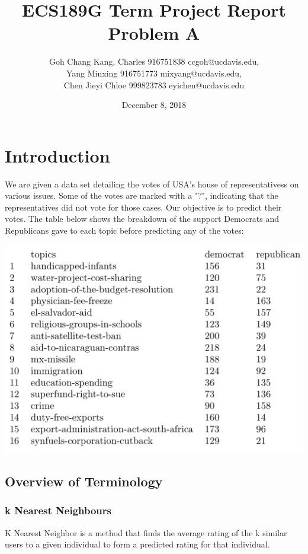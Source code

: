 \documentclass{article}
\begin{document}
\begin{titlepage}
\title{ECS189G Term Project Report Problem A}
\author{Goh Chang Kang, Charles 916751838 ccgoh@ucdavis.edu, \\
Yang Minxing 916751773 mixyang@ucdavis.edu, \\ 
Chen Jieyi Chloe 999823783 eyichen@ucdavis.edu}

\date{December 8, 2018}
\maketitle
\end{titlepage}

\tableofcontents
\pagebreak

\section{Introduction}

We are given a data set detailing the votes of USA's house of 
representativess on various issues. Some of the votes are marked with a "?", 
indicating that the representatives did not vote for those cases. Our objective
is to predict their votes. The table below shows the breakdown of the support
Democrats and Republicans gave to each topic before predicting any of the votes: \newline

\includegraphics[scale=0.5]{starting_votes.png}

\subsection{Overview of Terminology}
\subsubsection{k Nearest Neighbours}
K Nearest Neighbor is a method that finds the average rating of the k similar users to a 
given individual to form a predicted rating for that individual.
\end{document}
